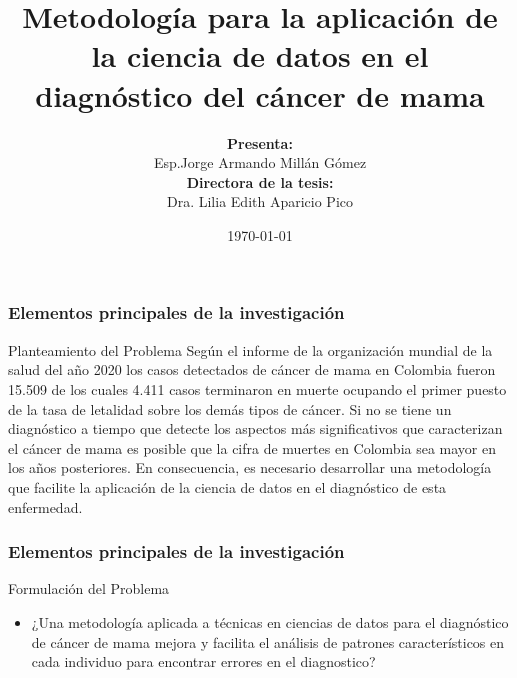 \documentclass[xcolor=dvipsnames,xcolor=table,10pt]{beamer} %
\title[Diagnóstico del cáncer de mama]{Metodología para la aplicación de la ciencia de datos en el diagnóstico del cáncer de mama}
\author[Jorge M., Edith A.]{\textbf{Presenta:}\\ Esp.Jorge Armando Millán Gómez\\[5mm]{\footnotesize \textbf{Directora de la tesis:}\\Dra. Lilia Edith Aparicio Pico\\}}
\institute[Universidad Distrital]{Maestria en Ciencias de la Información y las Comunicaciones \\Universidad Distrital ``Francisco José de Caldas'' }
\date{\today}
\begin{document}
\begin{frame}
	\titlepage
\end{frame}
\begin{frame}
	\frametitle{Elementos principales de la investigación}
	\begin{block}{Planteamiento del Problema}\justifying
	Según el informe de la organización mundial de la salud del año 2020 los casos detectados de cáncer de mama en Colombia fueron 15.509 de los cuales 4.411 casos terminaron en muerte ocupando el primer puesto de la tasa de letalidad sobre los demás tipos de cáncer. Si no se tiene un diagnóstico a tiempo que detecte los aspectos más significativos que caracterizan el cáncer de mama es posible que la cifra de muertes en Colombia sea mayor en los años posteriores. En consecuencia, es necesario desarrollar una metodología que facilite la aplicación de la ciencia de datos en el diagnóstico de esta enfermedad.
	\end{block}
\end{frame}

\begin{frame}
	\frametitle{Elementos principales de la investigación}
	\begin{block}{Formulación del Problema}\justifying
		\begin{itemize}
		 	\item ¿Una metodología aplicada a técnicas en ciencias de datos para el diagnóstico de cáncer de mama mejora y facilita el análisis de patrones característicos en cada individuo para encontrar errores en el diagnostico? 
		\end{itemize}
	\end{block}
\end{frame}
\end{document}
